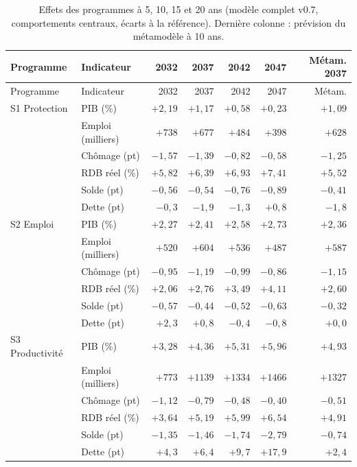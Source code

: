 \begin{longtable}{llrrrrr}\caption{Effets des programmes à 5, 10, 15 et 20 ans (modèle complet v0.7, comportements centraux, écarts à la référence). Dernière colonne : prévision du métamodèle à 10 ans.}\label{tab:horizons}\\ \toprule Programme & Indicateur & 2032 & 2037 & 2042 & 2047 & Métam. 2037\\ \midrule\endfirsthead\toprule Programme & Indicateur & 2032 & 2037 & 2042 & 2047 & Métam.\\ \midrule\endhead
S1 Protection & PIB (\%) & $+2{,}19$ & $+1{,}17$ & $+0{,}58$ & $+0{,}23$ & $+1{,}09$\\
 & Emploi (milliers) & $+738$ & $+677$ & $+484$ & $+398$ & $+628$\\
 & Chômage (pt) & $-1{,}57$ & $-1{,}39$ & $-0{,}82$ & $-0{,}58$ & $-1{,}25$\\
 & RDB réel (\%) & $+5{,}82$ & $+6{,}39$ & $+6{,}93$ & $+7{,}41$ & $+5{,}52$\\
 & Solde (pt) & $-0{,}56$ & $-0{,}54$ & $-0{,}76$ & $-0{,}89$ & $-0{,}41$\\
 & Dette (pt) & $-0{,}3$ & $-1{,}9$ & $-1{,}3$ & $+0{,}8$ & $-1{,}8$\\
\addlinespace
S2 Emploi & PIB (\%) & $+2{,}27$ & $+2{,}41$ & $+2{,}58$ & $+2{,}73$ & $+2{,}36$\\
 & Emploi (milliers) & $+520$ & $+604$ & $+536$ & $+487$ & $+587$\\
 & Chômage (pt) & $-0{,}95$ & $-1{,}19$ & $-0{,}99$ & $-0{,}86$ & $-1{,}15$\\
 & RDB réel (\%) & $+2{,}06$ & $+2{,}76$ & $+3{,}49$ & $+4{,}11$ & $+2{,}60$\\
 & Solde (pt) & $-0{,}57$ & $-0{,}44$ & $-0{,}52$ & $-0{,}63$ & $-0{,}32$\\
 & Dette (pt) & $+2{,}3$ & $+0{,}8$ & $-0{,}4$ & $-0{,}8$ & $+0{,}0$\\
\addlinespace
S3 Productivité & PIB (\%) & $+3{,}28$ & $+4{,}36$ & $+5{,}31$ & $+5{,}96$ & $+4{,}93$\\
 & Emploi (milliers) & $+773$ & $+1139$ & $+1334$ & $+1466$ & $+1327$\\
 & Chômage (pt) & $-1{,}12$ & $-0{,}79$ & $-0{,}48$ & $-0{,}40$ & $-0{,}51$\\
 & RDB réel (\%) & $+3{,}64$ & $+5{,}19$ & $+5{,}99$ & $+6{,}54$ & $+4{,}91$\\
 & Solde (pt) & $-1{,}35$ & $-1{,}46$ & $-1{,}74$ & $-2{,}79$ & $-0{,}74$\\
 & Dette (pt) & $+4{,}3$ & $+6{,}4$ & $+9{,}7$ & $+17{,}9$ & $+2{,}4$\\

\end{longtable}
